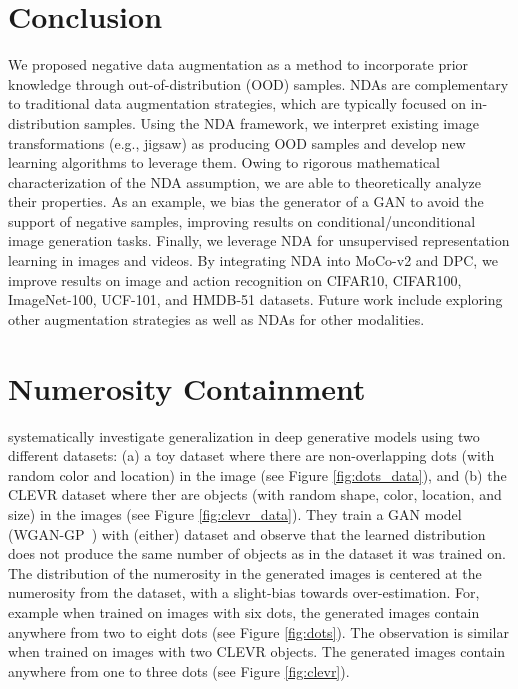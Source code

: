 \documentclass{article} \usepackage{iclr2021_conference,times}
\begin{document}
\section{Conclusion}
We proposed negative data augmentation as a method to incorporate prior knowledge through out-of-distribution (OOD) samples. NDAs are complementary to traditional data augmentation strategies, which are typically focused on in-distribution samples. 
Using the NDA framework, we interpret existing image transformations (e.g., jigsaw) as producing OOD samples and develop new learning algorithms to leverage them. Owing to rigorous mathematical characterization of the NDA assumption, we are able to theoretically analyze their properties.
As an example, we 
bias the generator of a GAN to avoid the support of negative samples, improving results on conditional/unconditional image generation tasks. Finally, we leverage NDA for unsupervised representation learning in images and videos. By integrating NDA into MoCo-v2 and DPC, we improve results on image and action recognition on CIFAR10, CIFAR100, ImageNet-100, UCF-101, and HMDB-51 datasets. 
Future work include exploring other augmentation strategies as well as NDAs for other modalities. 

%
 






\appendix
\appendix


\section{Numerosity Containment}
\label{sec:numerosity}
\cite{zhao2018bias} systematically investigate generalization in deep generative models using two different datasets: (a) a toy dataset where there are  non-overlapping dots (with random color and location) in the image (see Figure \ref{fig:dots_data}), and (b) the CLEVR dataset where ther are  objects (with random shape, color, location, and size) in the images (see Figure \ref{fig:clevr_data}). They train a GAN model (WGAN-GP~\cite{gulrajani2017improved}) with (either) dataset and observe that the learned distribution does not produce the same number of objects as in the dataset it was trained on. The distribution of the numerosity in the generated images is centered at the numerosity from the dataset, with a slight-bias towards over-estimation. For, example when trained on images with six dots, the generated images contain anywhere from two to eight dots (see Figure \ref{fig:dots}). The observation is similar when trained on images with two CLEVR objects. The generated images contain anywhere from one to three dots (see Figure \ref{fig:clevr}). 
\end{document}
